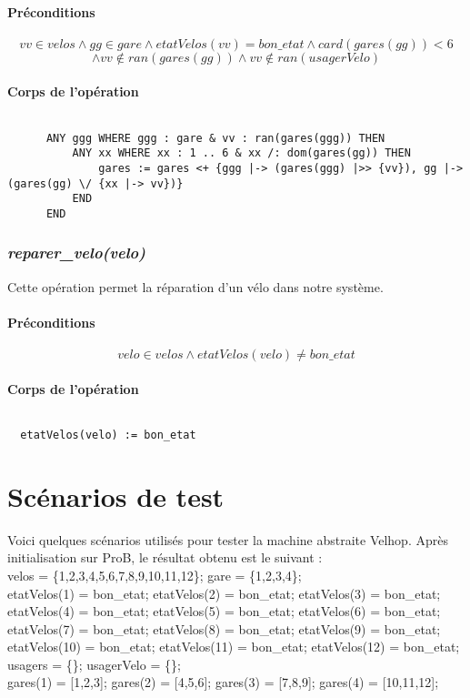 \documentclass[12pt]{article}
\begin{document}
\paragraph{Préconditions}
\[ vv \in velos \land gg \in gare \land etatVelos(vv) = bon\_etat \land card(gares(gg))<6 \]
\[\land vv \notin ran(gares(gg)) \land vv \notin ran(usagerVelo)\]
\paragraph{Corps de l'opération}
\[\]
\begin{lstlisting}
      ANY ggg WHERE ggg : gare & vv : ran(gares(ggg)) THEN
          ANY xx WHERE xx : 1 .. 6 & xx /: dom(gares(gg)) THEN
              gares := gares <+ {ggg |-> (gares(ggg) |>> {vv}), gg |-> (gares(gg) \/ {xx |-> vv})}
          END
      END
\end{lstlisting}

\subsubsection{\textit{reparer\_velo(velo)}}
Cette opération permet la réparation d'un vélo dans notre système.
\paragraph{Préconditions}
\[ velo \in velos \land etatVelos(velo) \neq bon\_etat \]
\paragraph{Corps de l'opération}
\[\]
\begin{lstlisting}
  etatVelos(velo) := bon_etat
\end{lstlisting}
\newpage
\section{Scénarios de test}
Voici quelques scénarios utilisés pour tester la machine abstraite Velhop. Après initialisation sur ProB, le résultat obtenu est le suivant : \\
velos = \{1,2,3,4,5,6,7,8,9,10,11,12\};
gare = \{1,2,3,4\}; \\
etatVelos(1) = bon\_etat;
etatVelos(2) = bon\_etat;
etatVelos(3) = bon\_etat;
etatVelos(4) = bon\_etat;
etatVelos(5) = bon\_etat;
etatVelos(6) = bon\_etat;
etatVelos(7) = bon\_etat;
etatVelos(8) = bon\_etat;
etatVelos(9) = bon\_etat;
etatVelos(10) = bon\_etat;
etatVelos(11) = bon\_etat;
etatVelos(12) = bon\_etat;  \\
usagers = \{\};
usagerVelo = \{\}; \\
gares(1) = [1,2,3];
gares(2) = [4,5,6];
gares(3) = [7,8,9];
gares(4) = [10,11,12];
\end{document}
